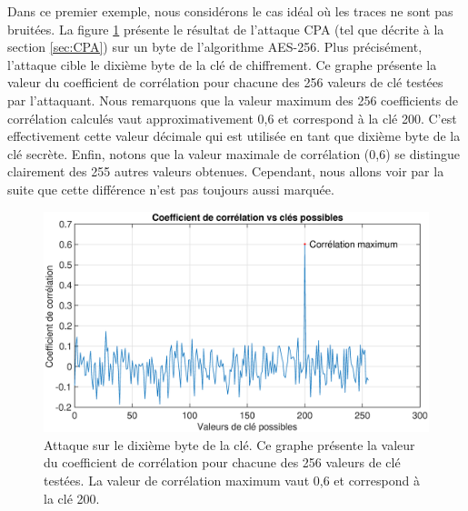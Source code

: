 \documentclass[oneside]{book}
\begin{document}
Dans ce premier exemple, nous considérons le cas idéal où les traces ne sont pas bruitées. La figure \ref{fig:sim_10000_traces} présente le résultat de l'attaque CPA (tel que décrite à la section \ref{sec:CPA}) sur un byte de l'algorithme AES-256. Plus précisément, l'attaque cible le dixième byte de la clé de chiffrement. Ce graphe présente la valeur du coefficient de corrélation pour chacune des 256 valeurs de clé testées par l'attaquant. Nous remarquons que la valeur maximum des 256 coefficients de corrélation calculés vaut approximativement 0,6 et correspond à la clé 200. C'est effectivement cette valeur décimale qui est utilisée en tant que dixième byte de la clé secrète. Enfin, notons que la valeur maximale de corrélation (0,6) se distingue clairement des 255 autres valeurs obtenues. Cependant, nous allons voir par la suite que cette différence n'est pas toujours aussi marquée. 

\begin{figure}[htbp]
    \hspace{-2cm}
    \includegraphics[scale=0.4]{image/sim_10000_traces}
    \caption{Attaque sur le dixième byte de la clé. Ce graphe présente la valeur du coefficient de corrélation pour chacune des 256 valeurs de clé testées. La valeur de corrélation maximum vaut 0,6 et correspond à la clé 200.}
    \label{fig:sim_10000_traces} 
\end{figure}

\newpage
\end{document}
